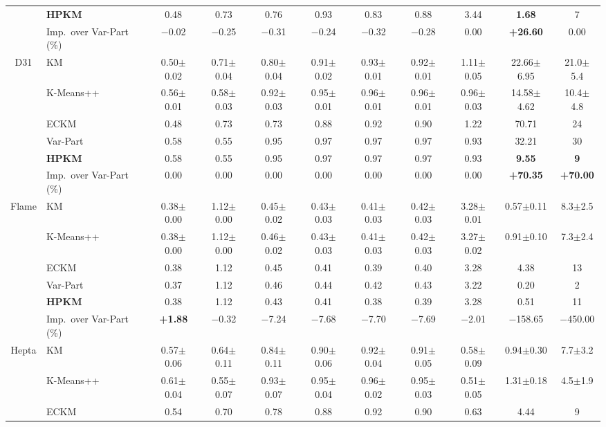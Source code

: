 \begin{table}[p]
\begin{adjustbox}{max width=\textwidth, max totalheight=0.85\textheight}
\begin{tabular}{|c|l|ccccccccc|}
 & \textbf{HPKM} & 0.48 & 0.73 & 0.76 & 0.93 & 0.83 & 0.88 & 3.44 & \textbf{1.68} & 7 \\
& Imp.\ over Var-Part (\%) & $-$0.02 & $-$0.25 & $-$0.31 & $-$0.24 & $-$0.32 & $-$0.28 & 0.00 & \textbf{+26.60} & 0.00 \\
\hline
D31 & KM & 0.50$\pm$0.02 & 0.71$\pm$0.04 & 0.80$\pm$0.04 & 0.91$\pm$0.02 & 0.93$\pm$0.01 & 0.92$\pm$0.01 & 1.11$\pm$0.05 & 22.66$\pm$6.95 & 21.0$\pm$5.4 \\
 & K-Means++ & 0.56$\pm$0.01 & 0.58$\pm$0.03 & 0.92$\pm$0.03 & 0.95$\pm$0.01 & 0.96$\pm$0.01 & 0.96$\pm$0.01 & 0.96$\pm$0.03 & 14.58$\pm$4.62 & 10.4$\pm$4.8 \\
 & ECKM & 0.48 & 0.73 & 0.73 & 0.88 & 0.92 & 0.90 & 1.22 & 70.71 & 24 \\
 & Var-Part & 0.58 & 0.55 & 0.95 & 0.97 & 0.97 & 0.97 & 0.93 & 32.21 & 30 \\
 & \textbf{HPKM} & 0.58 & 0.55 & 0.95 & 0.97 & 0.97 & 0.97 & 0.93 & \textbf{9.55} & \textbf{9} \\
& Imp.\ over Var-Part (\%) & 0.00 & 0.00 & 0.00 & 0.00 & 0.00 & 0.00 & 0.00 & \textbf{+70.35} & \textbf{+70.00} \\
\hline
Flame & KM & 0.38$\pm$0.00 & 1.12$\pm$0.00 & 0.45$\pm$0.02 & 0.43$\pm$0.03 & 0.41$\pm$0.03 & 0.42$\pm$0.03 & 3.28$\pm$0.01 & 0.57$\pm$0.11 & 8.3$\pm$2.5 \\
 & K-Means++ & 0.38$\pm$0.00 & 1.12$\pm$0.00 & 0.46$\pm$0.02 & 0.43$\pm$0.03 & 0.41$\pm$0.03 & 0.42$\pm$0.03 & 3.27$\pm$0.02 & 0.91$\pm$0.10 & 7.3$\pm$2.4 \\
 & ECKM & 0.38 & 1.12 & 0.45 & 0.41 & 0.39 & 0.40 & 3.28 & 4.38 & 13 \\
 & Var-Part & 0.37 & 1.12 & 0.46 & 0.44 & 0.42 & 0.43 & 3.22 & 0.20 & 2 \\
 & \textbf{HPKM} & 0.38 & 1.12 & 0.43 & 0.41 & 0.38 & 0.39 & 3.28 & 0.51 & 11 \\
& Imp.\ over Var-Part (\%) & \textbf{+1.88} & $-$0.32 & $-$7.24 & $-$7.68 & $-$7.70 & $-$7.69 & $-$2.01 & $-$158.65 & $-$450.00 \\
\hline
Hepta & KM & 0.57$\pm$0.06 & 0.64$\pm$0.11 & 0.84$\pm$0.11 & 0.90$\pm$0.06 & 0.92$\pm$0.04 & 0.91$\pm$0.05 & 0.58$\pm$0.09 & 0.94$\pm$0.30 & 7.7$\pm$3.2 \\
 & K-Means++ & 0.61$\pm$0.04 & 0.55$\pm$0.07 & 0.93$\pm$0.07 & 0.95$\pm$0.04 & 0.96$\pm$0.02 & 0.95$\pm$0.03 & 0.51$\pm$0.05 & 1.31$\pm$0.18 & 4.5$\pm$1.9 \\
 & ECKM & 0.54 & 0.70 & 0.78 & 0.88 & 0.92 & 0.90 & 0.63 & 4.44 & 9 \\

\end{tabular}
\end{adjustbox}
\end{table}
